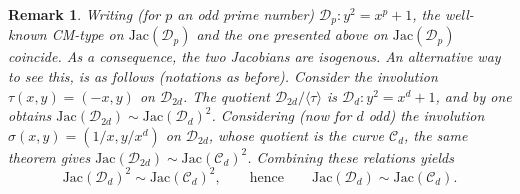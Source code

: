 \documentclass[a4paper,12pt]{amsart}
\def\cC{{\mathcal C}}
\def\cD{{\mathcal D}}
\numberwithin{equation}{section}
\theoremstyle{plain}
\numberwithin{thm}{section}
\newtheorem{remark}[thm]{Remark}
\begin{document}
\begin{remark} \rm{
Writing (for $p$ an odd prime number)
$\cD_p\colon y^2=x^p+1$, the well-known CM-type on $\textrm{Jac}(\cD_p)$
and the one presented above on
$\textrm{Jac}(\cD_p)$ coincide.
As a consequence, the two Jacobians are isogenous.
An alternative way to see this, is as follows (notations as before).   
Consider the involution $\tau(x,y)=(-x,y)$ on $\cD_{2d}$.  
The quotient $\cD_{2d}/\langle\tau\rangle$ is $\cD_d\colon y^2=x^d+1$, 
and by \cite[Theorem~5]{Pau} one obtains 
$\textrm{Jac}(\cD_{2d})\sim \textrm{Jac}(\cD_d)^2$.  
Considering (now for $d$ odd) the involution $\sigma(x,y)=(1/x,y/x^d)$ on $\cD_{2d}$, 
whose quotient is the curve $\cC_d$, the same theorem gives 
$\textrm{Jac}(\cD_{2d})\sim \textrm{Jac}(\cC_d)^2$.  
Combining these relations yields
\[
  \textrm{Jac}(\cD_d)^2 \sim \textrm{Jac}(\cC_d)^2,
  \qquad\text{hence}\qquad
  \textrm{Jac}(\cD_d)\sim \textrm{Jac}(\cC_d).
\]
}
\end{remark}





\end{document}
